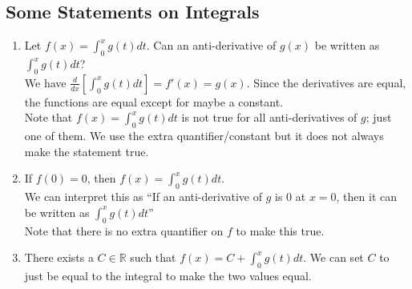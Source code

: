 \documentclass{article}
\begin{document}
\subsection{Some Statements on Integrals}
\begin{enumerate}
    \item Let $f(x) = \int_0^x g(t) dt$. Can an anti-derivative of $g(x) $ be written as $\int_0^x g(t)dt$?\\
    We have $\frac{d}{dx} \left[ \int_0^x g(t) dt \right] = f'(x) = g(x)$. Since the derivatives are equal, the functions are equal except for maybe a constant.\\
    Note that $f(x) = \int_0^x g(t) dt$ is not true for all anti-derivatives of $g$; just one of them. We use the extra quantifier/constant but it does not always make the statement true.
    
    \item If $f(0) = 0$, then $f(x) = \int_0^x g(t) dt$.\\
    We can interpret this as ``If an anti-derivative of $g$ is 0 at $x = 0$, then it can be written as $\int_0^x g(t) dt$''\\
    Note that there is no extra quantifier on $f$ to make this true.
    
    \item There exists a $C \in \mathbb{R}$ such that $f(x) = C + \int_0^x g(t) dt$. We can set $C$ to just be equal to the integral to make the two values equal.
\end{enumerate}
\end{document}
